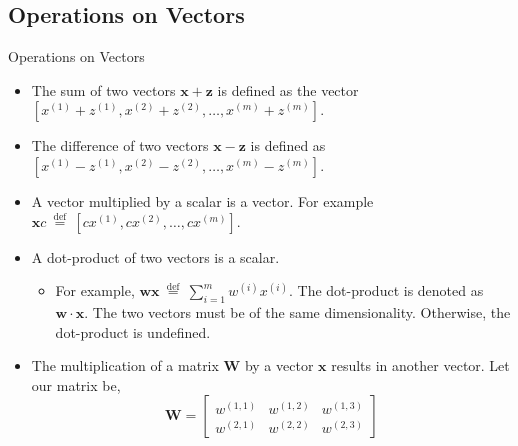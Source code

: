 \documentclass[9pt,dvipsnames]{beamer}
\begin{document}
\subsection{Operations on Vectors}
\begin{frame}{Operations on Vectors}
	\begin{itemize}
		\item The sum of two vectors $\mathbf{x}+\mathbf{z}$ is defined as the vector $\left[x^{(1)}+z^{(1)}, x^{(2)}+z^{(2)}, \ldots, x^{(m)}+z^{(m)}\right]$. 
		\item The difference of two vectors $\mathbf{x}-\mathbf{z}$ is defined as $\left[x^{(1)}-z^{(1)}, x^{(2)}-z^{(2)}, \ldots, x^{(m)}-z^{(m)}\right]$.
		\item A vector multiplied by a scalar is a vector. For example $\mathbf{x} c \stackrel{\text { def }}{=}\left[c x^{(1)}, c x^{(2)}, \ldots, c x^{(m)}\right]$.
		\item A dot-product of two vectors is a scalar. 
		\begin{itemize}
			\item For example, $\mathbf{w} \mathbf{x} \stackrel{\text { def }}{=} \sum_{i=1}^{m} w^{(i)} x^{(i)}$. The dot-product is denoted as $\mathbf{w} \cdot \mathbf{x}$. The two vectors must be of the same dimensionality. Otherwise, the dot-product is undefined.
		\end{itemize}
		\item The multiplication of a matrix $\mathbf{W}$ by a vector $\mathbf{x}$ results in another vector. Let our matrix be,
		$$
		\mathbf{W}=\left[\begin{array}{lll}
			w^{(1,1)} & w^{(1,2)} & w^{(1,3)} \\
			w^{(2,1)} & w^{(2,2)} & w^{(2,3)}
		\end{array}\right]
		$$
	\end{itemize}
\end{frame}
\end{document}
